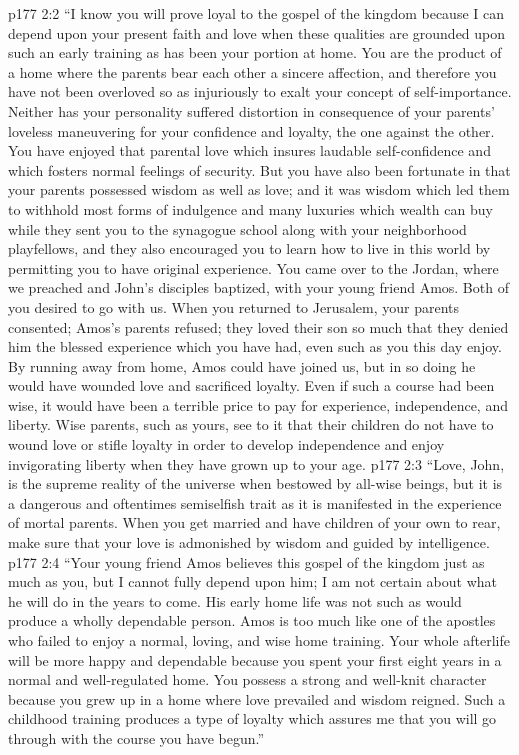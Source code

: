 \vs p177 2:2 \textcolor{ubdarkred}{“I know you will prove loyal to the gospel of the kingdom because I can depend upon your present faith and love when these qualities are grounded upon such an early training as has been your portion at home. You are the product of a home where the parents bear each other a sincere affection, and therefore you have not been overloved so as injuriously to exalt your concept of self\hyp{}importance. Neither has your personality suffered distortion in consequence of your parents’ loveless maneuvering for your confidence and loyalty, the one against the other. You have enjoyed that parental love which insures laudable self\hyp{}confidence and which fosters normal feelings of security. But you have also been fortunate in that your parents possessed wisdom as well as love; and it was wisdom which led them to withhold most forms of indulgence and many luxuries which wealth can buy while they sent you to the synagogue school along with your neighborhood playfellows, and they also encouraged you to learn how to live in this world by permitting you to have original experience. You came over to the Jordan, where we preached and John’s disciples baptized, with your young friend Amos. Both of you desired to go with us. When you returned to Jerusalem, your parents consented; Amos’s parents refused; they loved their son so much that they denied him the blessed experience which you have had, even such as you this day enjoy. By running away from home, Amos could have joined us, but in so doing he would have wounded love and sacrificed loyalty. Even if such a course had been wise, it would have been a terrible price to pay for experience, independence, and liberty. Wise parents, such as yours, see to it that their children do not have to wound love or stifle loyalty in order to develop independence and enjoy invigorating liberty when they have grown up to your age.}
\vs p177 2:3 \textcolor{ubdarkred}{“Love, John, is the supreme reality of the universe when bestowed by all\hyp{}wise beings, but it is a dangerous and oftentimes semiselfish trait as it is manifested in the experience of mortal parents. When you get married and have children of your own to rear, make sure that your love is admonished by wisdom and guided by intelligence.}
\vs p177 2:4 \textcolor{ubdarkred}{“Your young friend Amos believes this gospel of the kingdom just as much as you, but I cannot fully depend upon him; I am not certain about what he will do in the years to come. His early home life was not such as would produce a wholly dependable person. Amos is too much like one of the apostles who failed to enjoy a normal, loving, and wise home training. Your whole afterlife will be more happy and dependable because you spent your first eight years in a normal and well\hyp{}regulated home. You possess a strong and well\hyp{}knit character because you grew up in a home where love prevailed and wisdom reigned. Such a childhood training produces a type of loyalty which assures me that you will go through with the course you have begun.”}
